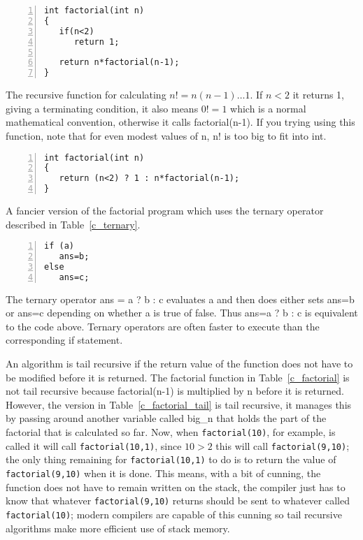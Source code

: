 \documentclass[11pt,a4paper]{scrartcl}
\begin{document}
\begin{table}[b]
\begin{lstlisting}[numbers=left]
int factorial(int n)
{
   if(n<2)
      return 1;

   return n*factorial(n-1);
}

\end{lstlisting}
\caption{The recursive function for calculating $n!=n(n-1)\ldots 1$. If $n<2$ it returns 1, giving a terminating condition, it also means $0!=1$ which is a normal mathematical convention, otherwise it calls factorial(n-1). If you trying using this function, note that for even modest values of n, n! is too big to fit into int.\label{c_factorial}}
\end{table}


\begin{table}
\begin{lstlisting}[numbers=left]
int factorial(int n)
{
   return (n<2) ? 1 : n*factorial(n-1);
}

\end{lstlisting}
\caption{A fancier version of the factorial program which uses the ternary operator described in Table~\ref{c_ternary}.\label{c_factorial_fancy}}
\end{table}


\begin{table}
\begin{lstlisting}[numbers=left]
if (a)
   ans=b;
else 
   ans=c;
\end{lstlisting}
\caption{The ternary operator ans = a ? b : c evaluates a and then
  does either sets ans=b or ans=c depending on whether a is true of
  false.  Thus ans=a ? b : c is equivalent to the code above. Ternary
  operators are often faster to execute than the corresponding if
  statement.\label{c_ternary}}
\end{table}

An algorithm is tail recursive if the return value of the function
does not have to be modified before it is returned. The factorial
function in Table~\ref{c_factorial} is not tail recursive because
factorial(n-1) is multiplied by n before it is returned. However, the
version in Table~\ref{c_factorial_tail} is tail recursive, it manages
this by passing around another variable called big\_n that holds the
part of the factorial that is calculated so far. Now, when
\texttt{factorial(10)}, for example, is called it will call
\texttt{factorial(10,1)}, since $10>2$ this will call
\texttt{factorial(9,10)}; the only thing remaining for
\texttt{factorial(10,1)} to do is to return the value of
\texttt{factorial(9,10)} when it is done. This means, with a bit of
cunning, the function does not have to remain written on the stack,
the compiler just has to know that whatever \texttt{factorial(9,10)}
returns should be sent to whatever called \texttt{factorial(10)};
modern compilers are capable of this cunning so tail recursive
algorithms make more efficient use of stack memory.
\end{document}
